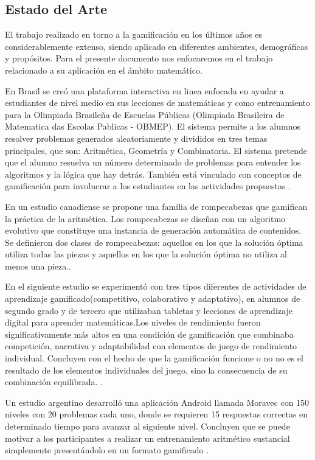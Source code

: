 \documentclass{article}
\begin{document}
\subsection{Estado del Arte}
El trabajo realizado en torno a la gamificación en los últimos años es considerablemente extenso, siendo aplicado en diferentes ambientes, demográficas y propósitos. Para el presente documento nos enfocaremos en el trabajo relacionado a su aplicación en el ámbito matemático.

En Brasil se creó una plataforma  interactiva en linea enfocada en ayudar a estudiantes de nivel medio en sus lecciones de matemáticas y como entrenamiento para la Olimpiada Brasileña de Escuelas Públicas (Olimpiada Brasileira de Matematica das Escolas Pablicas - OBMEP). El sistema permite a los alumnos resolver problemas generados aleatoriamente y divididos en tres temas principales, que son: Aritmética, Geometría y Combinatoria. El sistema pretende que el alumno resuelva un número determinado de problemas para entender los algoritmos y la lógica que hay detrás. También está vinculado con conceptos de gamificación para involucrar a los estudiantes en las actividades propuestas \cite{toda2014project}.

En un estudio canadiense se propone una familia de rompecabezas que gamifican la práctica de la aritmética. Los rompecabezas se diseñan con un algoritmo evolutivo que constituye una instancia de generación automática de contenidos. Se definieron dos clases de rompecabezas: aquellos en los que la solución óptima utiliza todas las piezas y aquellos en los que la solución óptima no utiliza al menos una pieza.\cite{foxcroft2020polyomino}.

En el siguiente estudio se experimentó con tres tipos diferentes de actividades de aprendizaje gamificado(competitivo, colaborativo y adaptativo), en alumnos de segundo grado y de tercero que utilizaban tabletas y lecciones de aprendizaje digital para aprender matemáticas.Los niveles de rendimiento fueron significativamente más altos en una condición de gamificación que combinaba competición, narrativa y adaptabilidad con elementos de juego de rendimiento individual. Concluyen con el hecho de que la gamificación funcione o no no es el resultado de los elementos individuales del juego, sino la consecuencia de su combinación equilibrada. \cite{jaguvst2018examining}.
 
Un estudio argentino desarrolló una aplicación Android llamada Moravec con 150 niveles con 20 problemas cada uno, donde se requieren 15 respuestas correctas en determinado tiempo para avanzar al siguiente nivel. Concluyen que se puede motivar a los participantes a realizar un entrenamiento aritmético sustancial simplemente presentándolo en un formato gamificado \cite{zimmerman2016arithmetic}.
\end{document}
